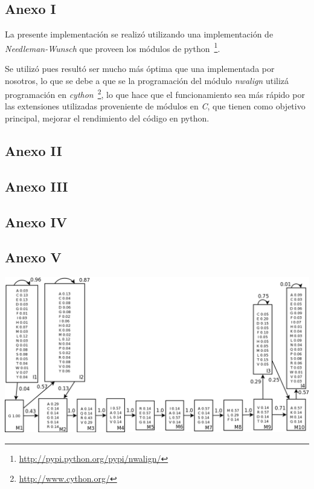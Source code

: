 \subsection{Anexo I}
\label{sec:anexo1}

La presente implementación se realizó utilizando una implementación
de \emph{Needleman-Wunsch} que proveen los módulos de python~\footnote{\url{http://pypi.python.org/pypi/nwalign/}}.

Se utilizó pues resultó ser mucho más óptima que una implementada por nosotros,
lo que se debe a que se la programación del módulo \emph{nwalign} utilizá programación
en \emph{cython}~\footnote{\url{http://www.cython.org/}}, lo que hace que el funcionamiento
sea más rápido por las extensiones utilizadas proveniente de módulos en \emph{C},
que tienen como objetivo principal, mejorar el rendimiento del código en python.


\begin{small}
	
\end{small}

\newpage
\subsection{Anexo II}
\label{sec:anexo2}
\begin{small}
	
\end{small}

\newpage
\subsection{Anexo III}
\label{sec:anexo3}
\begin{small}
	
\end{small}

\newpage
\subsection{Anexo IV}
\label{sec:anexo4}
\begin{small}
	
\end{small}

\newpage
\subsection{Anexo V}
\label{sec:anexo5}
\includegraphics[angle=270,scale=0.55]{img/hmm}
